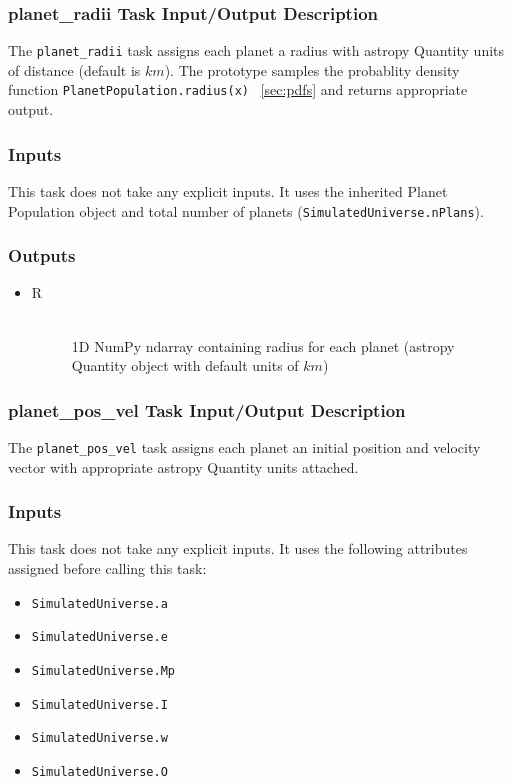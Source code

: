 \documentclass[cleanfoot]{asme2ej}
\begin{document}
\subsubsection{planet\_radii Task Input/Output Description} \label{sec:planetradiitask}
The \verb+planet_radii+ task assigns each planet a radius with astropy Quantity units of distance (default is $ km $). The prototype samples the probablity density function \verb+PlanetPopulation.radius(x)+ ~\ref{sec:pdfs} and returns appropriate output.

\subsubsection*{Inputs}
This task does not take any explicit inputs.  It uses the inherited Planet Population object and total number of planets (\verb+SimulatedUniverse.nPlans+).

\subsubsection*{Outputs}
\begin{itemize}
    \item 
    \begin{description}
        \item[R] \hfill \\
        1D NumPy ndarray containing radius for each planet (astropy Quantity object with default units of $ km $)
    \end{description}
\end{itemize}

\subsubsection{planet\_pos\_vel Task Input/Output Description} \label{sec:planetposveltask}
The \verb+planet_pos_vel+ task assigns each planet an initial position and velocity vector with appropriate astropy Quantity units attached.

\subsubsection*{Inputs}
This task does not take any explicit inputs.  It uses the following attributes assigned before calling this task:
\begin{itemize}
    \item \verb+SimulatedUniverse.a+
    \item \verb+SimulatedUniverse.e+
    \item \verb+SimulatedUniverse.Mp+
    \item \verb+SimulatedUniverse.I+
    \item \verb+SimulatedUniverse.w+
    \item \verb+SimulatedUniverse.O+
\end{itemize}
\end{document}
